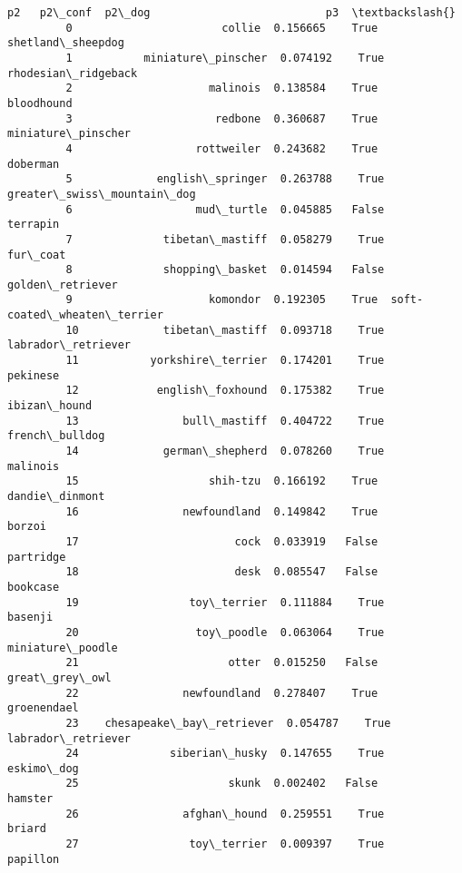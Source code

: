 \documentclass[11pt]{article}
\begin{document}
\begin{Verbatim}[commandchars=\\\{\}]
                                     p2   p2\_conf  p2\_dog                           p3  \textbackslash{}
         0                       collie  0.156665    True            shetland\_sheepdog   
         1           miniature\_pinscher  0.074192    True          rhodesian\_ridgeback   
         2                     malinois  0.138584    True                   bloodhound   
         3                      redbone  0.360687    True           miniature\_pinscher   
         4                   rottweiler  0.243682    True                     doberman   
         5             english\_springer  0.263788    True   greater\_swiss\_mountain\_dog   
         6                   mud\_turtle  0.045885   False                     terrapin   
         7              tibetan\_mastiff  0.058279    True                     fur\_coat   
         8              shopping\_basket  0.014594   False             golden\_retriever   
         9                     komondor  0.192305    True  soft-coated\_wheaten\_terrier   
         10             tibetan\_mastiff  0.093718    True           labrador\_retriever   
         11           yorkshire\_terrier  0.174201    True                     pekinese   
         12            english\_foxhound  0.175382    True                 ibizan\_hound   
         13                bull\_mastiff  0.404722    True               french\_bulldog   
         14             german\_shepherd  0.078260    True                     malinois   
         15                    shih-tzu  0.166192    True               dandie\_dinmont   
         16                newfoundland  0.149842    True                       borzoi   
         17                        cock  0.033919   False                    partridge   
         18                        desk  0.085547   False                     bookcase   
         19                 toy\_terrier  0.111884    True                      basenji   
         20                  toy\_poodle  0.063064    True             miniature\_poodle   
         21                       otter  0.015250   False               great\_grey\_owl   
         22                newfoundland  0.278407    True                  groenendael   
         23    chesapeake\_bay\_retriever  0.054787    True           labrador\_retriever   
         24              siberian\_husky  0.147655    True                   eskimo\_dog   
         25                       skunk  0.002402   False                      hamster   
         26                afghan\_hound  0.259551    True                       briard   
         27                 toy\_terrier  0.009397    True                     papillon   

\end{Verbatim}
\end{document}
